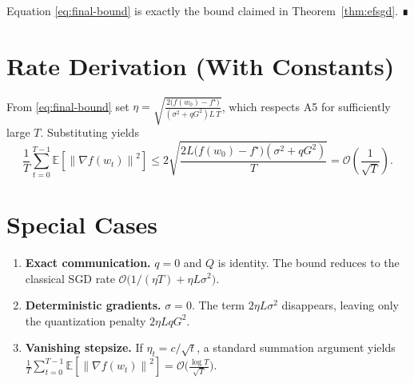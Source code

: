 \documentclass{article}
\newcommand{\E}{\mathbb{E}}
\newcommand{\norm}[1]{\left\|#1\right\|}
\begin{document}
Equation \eqref{eq:final-bound} is exactly the bound claimed in Theorem~\ref{thm:efsgd}. ∎

\section*{Rate Derivation (With Constants)}
From \eqref{eq:final-bound} set $\eta = \sqrt{\frac{2\bigl(f(w_{0})-f^{\star}\bigr)}{( \sigma^{2}+qG^{2})L\,T}}$, which respects A5 for sufficiently large $T$. Substituting yields
\[
\frac{1}{T}\sum_{t=0}^{T-1}\E[\norm{\nabla f(w_{t})}^{2}]
\le
2\sqrt{\frac{2L\bigl(f(w_{0})-f^{\star}\bigr)(\sigma^{2}+qG^{2})}{T}}
= \mathcal{O}\!\left(\frac{1}{\sqrt{T}}\right).
\]

\section*{Special Cases}
\begin{enumerate}[label=\alph*)]
\item \textbf{Exact communication.} $q=0$ and $Q$ is identity. The bound reduces to the classical SGD rate $\mathcal{O}\bigl(1/(\eta T)+\eta L\sigma^{2}\bigr)$.
\item \textbf{Deterministic gradients.} $\sigma=0$. The term $2\eta L\sigma^{2}$ disappears, leaving only the quantization penalty $2\eta L q G^{2}$.
\item \textbf{Vanishing stepsize.} If $\eta_{t}=c/\sqrt{t}$, a standard summation argument yields $\frac{1}{T}\sum_{t=0}^{T-1}\E[\norm{\nabla f(w_{t})}^{2}]=\mathcal{O}\bigl(\frac{\log T}{\sqrt{T}}\bigr)$.
\end{enumerate}
\end{document}

